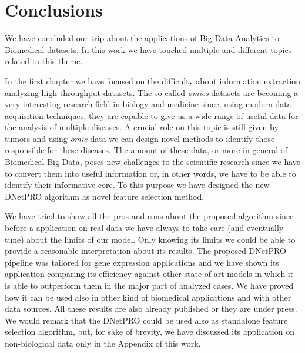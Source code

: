 \documentclass{standalone}
\begin{document}
\chapter*{Conclusions}\label{conclusions}

We have concluded our trip about the applications of Big Data Analytics to Biomedical datasets.
In this work we have touched multiple and different topics related to this theme.

In the first chapter we have focused on the difficulty about information extraction analyzing high-throughput datasets.
The so-called \emph{omics} datasets are becoming a very interesting research field in biology and medicine since, using modern data acquisition techniques, they are capable to give us a wide range of useful data for the analysis of multiple diseases.
A crucial role on this topic is still given by tumors and using \emph{omic} data we can design novel methods to identify those responsible for these diseases.
The amount of these data, or more in general of Biomedical Big Data, poses new challenges to the scientific research since we have to convert them into useful information or, in other words, we have to be able to identify their informative core.
To this purpose we have designed the new \textsf{DNetPRO} algorithm as novel feature selection method.

We have tried to show all the pros and cons about the proposed algorithm since before a application on real data we have always to take care (and eventually tune) about the limits of our model.
Only knowing its limits we could be able to provide a reasonable interpretation about its results.
The proposed \textsf{DNetPRO} pipeline was tailored for gene expression applications and we have shown its application comparing its efficiency against other state-of-art models in which it is able to outperform them in the major part of analyzed cases.
We have proved how it can be used also in other kind of biomedical applications and with other data sources.
All these results are also already published or they are under press.
We would remark that the \textsf{DNetPRO} could be used also as standalone feature selection algorithm, but, for sake of brevity, we have discussed its application on non-biological data only in the Appendix of this work.
\end{document}
